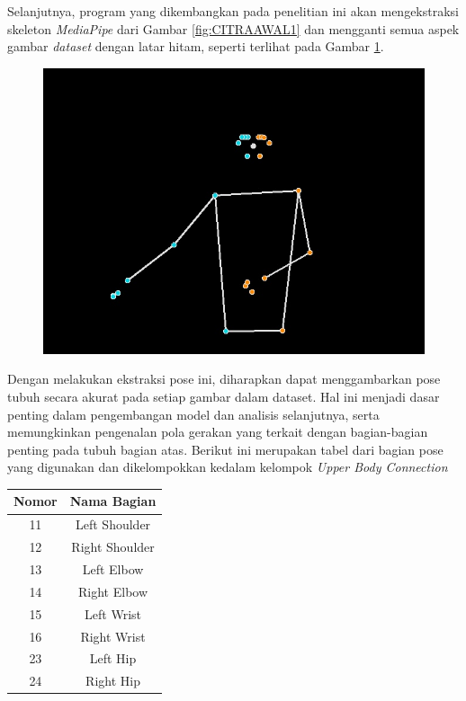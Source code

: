 Selanjutnya, program yang dikembangkan pada penelitian ini akan mengekstraksi skeleton \textit{MediaPipe} dari Gambar \ref{fig:CITRAAWAL1} dan mengganti semua aspek gambar \textit{dataset} dengan latar hitam, seperti terlihat pada Gambar \ref{fig:CITRAAKHIR1}.
\begin{figure}[hbt!]
	\centering
	\includegraphics[width=0.7\linewidth]{gambar/Gambar3.4.jpg}
	\label{fig:CITRAAKHIR1}
\end{figure}
Dengan melakukan ekstraksi pose ini, diharapkan dapat menggambarkan pose tubuh secara akurat pada setiap gambar dalam dataset. Hal ini menjadi dasar penting dalam pengembangan model dan analisis selanjutnya, serta memungkinkan pengenalan pola gerakan yang terkait dengan bagian-bagian penting pada tubuh bagian atas. Berikut ini merupakan tabel dari bagian pose yang digunakan dan dikelompokkan kedalam kelompok \textit{Upper Body Connection}
\begin{center}
	\begin{table}[hbt!]
		\label{tbl:PoseLandmarks}
		\centering
		\begin{tabular}{cc}
			\hline
			Nomor & Nama Bagian \\
			\hline
			
			11 & Left Shoulder \\
			\hline
			
			12 & Right Shoulder \\
			\hline
			
			13 & Left Elbow \\
			\hline
			
			14 & Right Elbow \\
			\hline
			
			15 & Left Wrist \\
			\hline
			
			16 & Right Wrist \\
			\hline
			
			23 & Left Hip \\
			\hline
			
			24 & Right Hip \\
			\hline
		\end{tabular}
	\end{table}
	\end{center}
